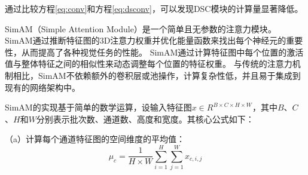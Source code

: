 通过比较方程\ref{eq:conv}和方程\ref{eq:dsconv}，可以发现DSC模块的计算量显著降低。

\begin{figure}[htbp]
    \centering
    \captionsetup{font=footnotesize}
    \label{fig:nnConv}
\end{figure}

\begin{figure}[htbp]
    \centering
    \captionsetup{font=footnotesize}
    \label{fig:DSC}
\end{figure}

SimAM（Simple Attention Module）是一个简单且无参数的注意力模块\cite{simam}。 
SimAM通过推断特征图的3D注意力权重并优化能量函数来找出每个神经元的重要性，从而提高了各种视觉任务的性能。
SimAM通过计算特征图中每个位置的激活值与整体特征之间的相似性来动态调整每个位置的特征权重。
与传统的注意力机制相比，SimAM不依赖额外的卷积层或池操作，计算复杂性低，并且易于集成到现有的网络架构中。

SimAM的实现基于简单的数学运算，设输入特征图$x\in{R^{{B}\times{C}\times{H}\times{W}}}$，其中$B$、$C$、$H$和$W$分别表示批次数、通道数、高度和宽度。其核心公式如下：

（a）计算每个通道特征图的空间维度的平均值：
\begin{equation}
    \label{eq:simam1}
    \mu_c = \frac{1}{{H}\times{W}}\sum\limits_{i=1}^{H}\sum\limits_{j=1}^{W}x_{c,i,j}
\end{equation}


